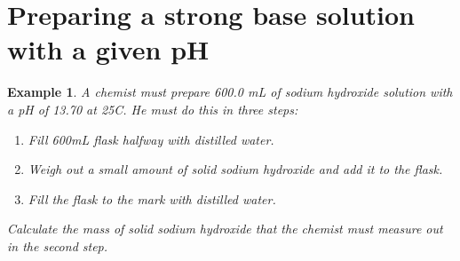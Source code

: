\documentclass{article}  %
\newtheorem{exmp}{Example}
\begin{document}
\section*{Preparing a strong base solution with a given pH}
\begin{exmp}
    A chemist must prepare 600.0 mL of sodium hydroxide solution with a pH of 13.70 at 25C. He must do this in three steps:
    \begin{enumerate}
        \item Fill 600mL flask halfway with distilled water.
        \item Weigh out a small amount of solid sodium hydroxide and add it to the flask.
        \item Fill the flask to the mark with distilled water.
    \end{enumerate}
    Calculate the mass of solid sodium hydroxide that the chemist must measure out in the second step.
\end{exmp}
\end{document}
